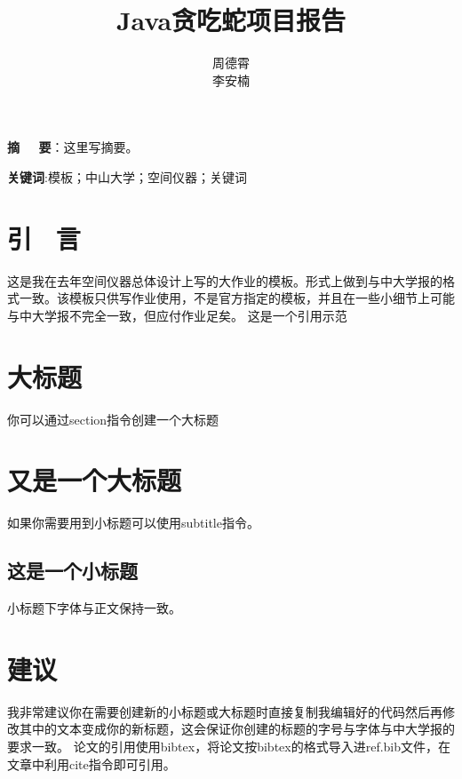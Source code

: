 \documentclass{article}
\title{\zihao{2}\songti \textbf{Java贪吃蛇项目报告}}
\author{\zihao{-4}\kaishu 周德霄\\ \zihao{-4}\kaishu 李安楠}
\affil{\zihao{5}\kaishu 埃尔朗根-纽伦堡大学，德国 \ 埃尔朗根91052}
\affil{\zihao{5}\kaishu 奔曜科技有限公司，中国 \ 上海}
\date{}
\begin{document}
\maketitle
\thispagestyle{mystyle}
\noindent
{}\songti \textbf{摘 \ \ 要}：这里写摘要。

\noindent
\textbf{关键词}:模板；中山大学；空间仪器；关键词
\setlength\columnsep{0.8cm} %
\begin{multicols}{2} %


\section{\kaishu 引 \ 言}
\songti 这是我在去年空间仪器总体设计上写的大作业的模板。形式上做到与中大学报的格式一致。该模板只供写作业使用，不是官方指定的模板，并且在一些小细节上可能与中大学报不完全一致，但应付作业足矣。 这是一个引用示范\cite{1998Gravitational}


\section{\kaishu 大标题}
你可以通过section指令创建一个大标题


\section{\kaishu 又是一个大标题}
如果你需要用到小标题可以使用subtitle指令。

\subsection{\songti 这是一个小标题}
小标题下字体与正文保持一致。

\section{\kaishu 建议}
我非常建议你在需要创建新的小标题或大标题时直接复制我编辑好的代码然后再修改其中的文本变成你的新标题，这会保证你创建的标题的字号与字体与中大学报的要求一致。
论文的引用使用bibtex，将论文按bibtex的格式导入进ref.bib文件，在文章中利用cite指令即可引用。
\end{multicols} %

\end{document}
